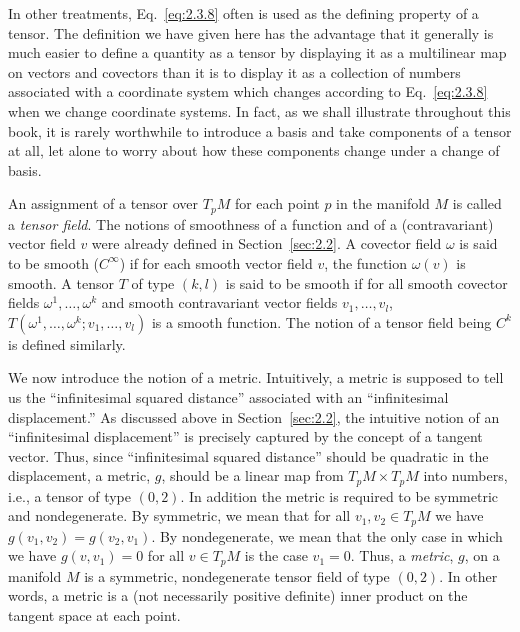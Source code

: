 In other treatments, Eq.~\eqref{eq:2.3.8} often is used as the defining property of
a tensor.  The definition we have given here has the advantage that it generally is
much easier to define a quantity as a tensor by displaying it as a multilinear map on
vectors and covectors than it is to display it as a collection of numbers associated
with a coordinate system which changes according to Eq.~\eqref{eq:2.3.8} when we
change coordinate systems.  In fact, as we shall illustrate throughout this book, it
is rarely worthwhile to introduce a basis and take components of a tensor at all, let
alone to worry about how these components change under a change of basis.

An assignment of a tensor over \(T_pM\) for each point \(p\) in the manifold \(M\)
is called a \emph{tensor field}.  The notions of smoothness of a function and of a
(contravariant) vector field \(v\) were already defined in Section~\ref{sec:2.2}.  A
covector field \(\omega\) is said to be smooth (\(C^\infty\)) if for each smooth
vector field \(v\), the function \(\omega(v)\) is smooth.  A tensor \(T\) of type
\((k,l)\) is said to be smooth if for all smooth covector fields
\(\omega^1,\ldots,\omega^k\) and smooth contravariant vector fields
\(v_1,\ldots,v_l\), \(T(\omega^1,\ldots,\omega^k;v_1,\ldots,v_l)\) is a smooth
function.  The notion of a tensor field being \(C^k\) is defined similarly.

We now introduce the notion of a metric.  Intuitively, a metric is supposed to tell
us the ``infinitesimal squared distance'' associated with an ``infinitesimal
displacement.''  As discussed above in Section~\ref{sec:2.2}, the intuitive notion
of an ``infinitesimal displacement'' is precisely captured by the concept of a
tangent vector.  Thus, since ``infinitesimal squared distance'' should be quadratic
in the displacement, a metric, \(g\), should be a linear map from
\(T_pM\times T_pM\) into numbers, i.e., a tensor of type \((0,2)\).  In addition
the metric is required to be symmetric and nondegenerate.  By symmetric, we mean
that for all \(v_1,v_2\in T_pM\) we have \(g(v_1,v_2)=g(v_2,v_1)\).  By
nondegenerate, we mean that the only case in which we have \(g(v,v_1)=0\) for all
\(v\in T_pM\) is the case \(v_1=0\).  Thus, a \emph{metric}, \(g\), on a manifold
\(M\) is a symmetric, nondegenerate tensor field of type \((0,2)\).  In other
words, a metric is a (not necessarily positive definite) inner product on the tangent
space at each point.

